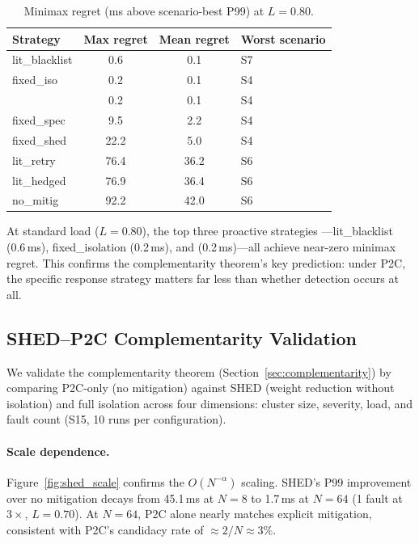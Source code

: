 \begin{table}[t]
\centering
\caption{Minimax regret (ms above scenario-best P99) at $L = 0.80$.}
\label{tab:regret}
\footnotesize
\begin{tabular}{@{}lccl@{}}
\toprule
Strategy & Max regret & Mean regret & Worst scenario \\
\midrule
lit\_blacklist & 0.6 & 0.1 & S7 \\
fixed\_iso & 0.2 & 0.1 & S4 \\
\system{} & 0.2 & 0.1 & S4 \\
fixed\_spec & 9.5 & 2.2 & S4 \\
fixed\_shed & 22.2 & 5.0 & S4 \\
lit\_retry & 76.4 & 36.2 & S6 \\
lit\_hedged & 76.9 & 36.4 & S6 \\
no\_mitig & 92.2 & 42.0 & S6 \\
\bottomrule
\end{tabular}
\end{table}

At standard load ($L = 0.80$), the top three proactive strategies
---lit\_blacklist (0.6\,ms), fixed\_isolation (0.2\,ms), and \system{}
(0.2\,ms)---all achieve near-zero minimax regret. This confirms the
complementarity theorem's key prediction: under P2C, the specific
response strategy matters far less than whether detection occurs at all.

\subsection{SHED--P2C Complementarity Validation}
\label{sec:eval-shed}

We validate the complementarity theorem
(Section~\ref{sec:complementarity}) by comparing P2C-only (no mitigation)
against SHED (weight reduction without isolation) and full isolation
across four dimensions: cluster size, severity, load, and fault count
(S15, 10 runs per configuration).

\paragraph{Scale dependence.}
Figure~\ref{fig:shed_scale} confirms the $O(N^{-\alpha})$ scaling.
SHED's P99 improvement over no mitigation decays from 45.1\,ms at $N=8$
to 1.7\,ms at $N=64$ (1 fault at $3\times$, $L=0.70$). At $N=64$,
P2C alone nearly matches explicit mitigation, consistent with P2C's
candidacy rate of $\approx 2/N \approx 3\%$.

